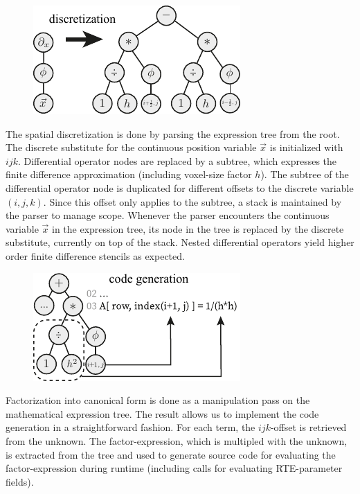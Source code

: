 \documentclass{egpubl}
\begin{document}
\begin{figure}
\hspace{-.2in}
\includegraphics[width=0.6\columnwidth]{fig_discretization_small.pdf}
\end{figure}
The spatial discretization is done by parsing the expression tree from the root. The discrete substitute for the continuous position variable $\vec{x}$ is initialized with $ijk$. Differential operator nodes are replaced by a subtree, which expresses the finite difference approximation (including voxel-size factor $h$). The subtree of the differential operator node is duplicated for different offsets to the discrete variable $(i, j, k)$. Since this offset only applies to the subtree, a stack is maintained by the parser to manage scope. Whenever the parser encounters the continuous variable $\vec{x}$ in the expression tree, its node in the tree is replaced by the discrete substitute, currently on top of the stack. Nested differential operators yield higher order finite difference stencils as expected.

\begin{figure}
\hspace{-.2in}
\includegraphics[width=0.6\columnwidth]{fig_codegen_small.pdf}
\end{figure}
Factorization into canonical form is done as a manipulation pass on the mathematical expression tree. The result allows us to implement the code generation in a straightforward fashion. For each term, the $ijk$-offset is retrieved from the unknown. The factor-expression, which is multipled with the unknown, is extracted from the tree and used to generate source code for evaluating the factor-expression during runtime (including calls for evaluating RTE-parameter fields).
\end{document}
